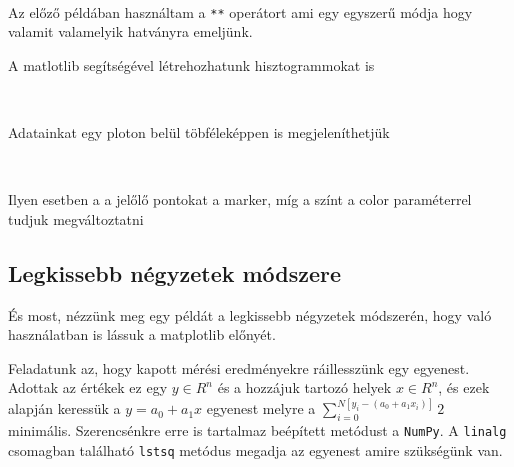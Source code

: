 \begin{python}

\end{python}

    \begin{center}
    \end{center}
    { \hspace*{\fill} \\}
    
    Az előző példában használtam a \texttt{**} operátort ami egy egyszerű
módja hogy valamit valamelyik hatványra emeljünk.

    A matlotlib segítségével létrehozhatunk hisztogrammokat is

\begin{python}

\end{python}
        
    \begin{center}
    \end{center}
    { \hspace*{\fill} \\}
    
    Adatainkat egy ploton belül töbféleképpen is megjeleníthetjük

\begin{python}

\end{python}

    \begin{center}
    \end{center}
    { \hspace*{\fill} \\}
    
    Ilyen esetben a a jelőlő pontokat a marker, míg a színt a color
paraméterrel tudjuk megváltoztatni

    \subsection{Legkissebb négyzetek
módszere}\label{legkissebb-nuxe9gyzetek-muxf3dszere}

    És most, nézzünk meg egy példát a legkissebb négyzetek módszerén, hogy
való használatban is lássuk a matplotlib előnyét.

    Feladatunk az, hogy kapott mérési eredményekre ráillesszünk egy
egyenest. Adottak az értékek ez egy \(y \in R^n\) és a hozzájuk tartozó
helyek $x\in R^n$, és ezek alapján keressük a \(y= a_0+a_1x\)
egyenest melyre a
$\sum_{i=0}^{N[y_i-(a_0+a_1 x_i)]}2$
minimális. Szerencsénkre erre is tartalmaz beépített metódust a
\texttt{NumPy}. A \texttt{linalg} csomagban található \texttt{lstsq}
metódus megadja az egyenest amire szükségünk van.

